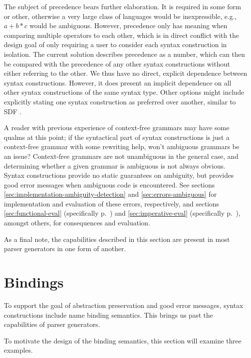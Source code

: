 \documentclass{kththesis}
\begin{document}
The subject of precedence bears further elaboration. It is required in some form or other, otherwise a very large class of languages would be inexpressible, e.g., $a + b * c$ would be ambiguous. However, precedence only has meaning when comparing multiple operators to each other, which is in direct conflict with the design goal of only requiring a user to consider each syntax construction in isolation. The current solution describes precedence as a number, which can then be compared with the precedence of any other syntax constructions without either referring to the other. We thus have no direct, explicit dependence between syntax constructions. However, it does present an implicit dependence on all other syntax constructions of the same syntax type. Other options might include explicitly stating one syntax construction as preferred over another, similar to SDF \cite{Heering1989The-syntax-defi}.

A reader with previous experience of context-free grammars may have some qualms at this point; if the syntactical part of syntax constructions is just a context-free grammar with some rewriting help, won't ambiguous grammars be an issue? Context-free grammars are not unambiguous in the general case, and determining whether a given grammar is ambiguous is not always obvious. Syntax constructions provide no static guarantees on ambiguity, but provides good error messages when ambiguous code is encountered. See sections \ref{sec:implementation-ambiguity-detection} and \ref{sec:errors-ambiguous} for implementation and evaluation of these errors, respectively, and sections \ref{sec:functional-eval} (specifically p.~\pageref{sec:ambiguous-lists}) and \ref{sec:imperative-eval} (specifically p.~\pageref{sec:lua-func-call-precedence}), amongst others, for consequences and evaluation.

As a final note, the capabilities described in this section are present in most parser generators in one form of another.

\section{Bindings} \label{sec:design-bindings}

To support the goal of abstraction preservation and good error messages, syntax constructions include name binding semantics. This brings us past the capabilities of parser generators.

To motivate the design of the binding semantics, this section will examine three examples.
\end{document}
